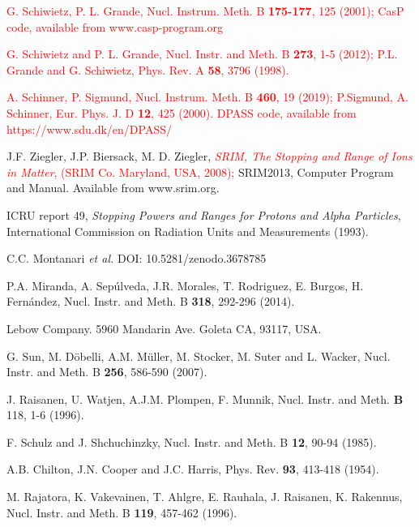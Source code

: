\documentclass[aps,pra,reprint,superscriptaddress]{revtex4-1}
\def\clau#1{\textcolor{red}{#1}}
\begin{document}
\begin{thebibliography}{00}
 \clau{G. Schiwietz, P. L. Grande, Nucl. Instrum. Meth. B \textbf{175-177}, 125 (2001); CasP code, available from www.casp-program.org}

 \clau{G. Schiwietz and P. L. Grande,
Nucl. Instr. and Meth. B \textbf{273}, 1-5 (2012); P.L. Grande and G. Schiwietz,
Phys. Rev. A \textbf{58}, 3796 (1998).}

 \clau{A. Schinner, P. Sigmund, Nucl. Instrum. Meth. B \textbf{460}, 19 (2019); P.Sigmund, A. Schinner, Eur. Phys. J. D \textbf{12}, 425 (2000). DPASS code, available from https://www.sdu.dk/en/DPASS/}

J.F. Ziegler, J.P. Biersack, M. D. Ziegler, \clau{\textit{SRIM, The Stopping and Range of Ions in Matter}, (SRIM Co. Maryland, USA, 2008);} SRIM2013, 
Computer Program and Manual. Available from www.srim.org.

ICRU report 49, \textit{Stopping Powers and Ranges for Protons and Alpha Particles},
International Commission on Radiation Units and Measurements (1993).

C.C. Montanari {\it et al.} DOI: 10.5281/zenodo.3678785 

 P.A. Miranda, A. Sep\'ulveda, J.R. Morales, 
T. Rodriguez, E. Burgos, H. Fern\'andez,
Nucl. Instr. and Meth. B \textbf{318}, 292-296  (2014).

Lebow Company. 5960 Mandarin Ave. Goleta CA, 93117, USA.

G. Sun, M. D\"{o}belli, A.M. M\"{u}ller, M. Stocker, M. Suter and 
L. Wacker, 
Nucl. Instr. and Meth. B \textbf{256}, 586-590 (2007).

J. Raisanen, U. Watjen, A.J.M. Plompen, F. Munnik, 
Nucl. Instr. and Meth. \textbf{B} 118, 1-6  (1996).

F. Schulz and J. Shchuchinzky, 
Nucl. Instr. and Meth. B \textbf{12},  90-94 (1985).

A.B. Chilton, J.N. Cooper and J.C. Harris, 
Phys. Rev. \textbf{93}, 413-418  (1954).

M. Rajatora, K. Vakevainen, T. Ahlgre, E. Rauhala, J. Raisanen, 
K. Rakennus, 
Nucl. Instr. and Meth. B \textbf{119}, 457-462 (1996).


\end{thebibliography}
\end{document}
